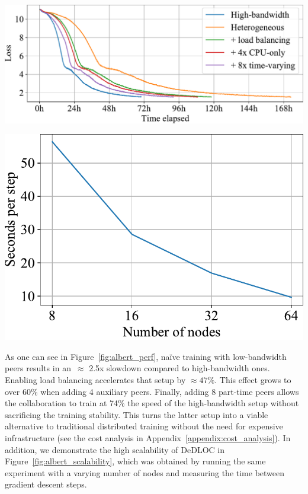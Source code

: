 \begin{minipage}[b][][b]{0.65\textwidth}
\centering
\includegraphics[width=\textwidth]{resources/convergence_albert.pdf}
\vspace{-14pt}
\label{fig:albert_perf}
\end{minipage}
\begin{minipage}[b][][b]{0.32\textwidth}
\centering
\includegraphics[width=\textwidth]{resources/albert_scalability.pdf}
\vspace{-14pt}
\label{fig:albert_scalability}
\end{minipage}

As one can see in Figure~\ref{fig:albert_perf}, naïve training with low-bandwidth peers results in an~$\approx$ 2.5x slowdown compared to high-bandwidth ones. Enabling load balancing accelerates that setup by $\approx47\%$. This effect grows to over 60\% when adding 4 auxiliary peers. Finally, adding 8 part-time peers allows the collaboration to train at 74\% the speed of the high-bandwidth setup without sacrificing the training stability. This turns the latter setup into a viable alternative to traditional distributed training without the need for expensive infrastructure (see the cost analysis in Appendix~\ref{appendix:cost_analysis}). In addition, we demonstrate the high scalability of DeDLOC in Figure~\ref{fig:albert_scalability}, which was obtained by running the same experiment with a varying number of nodes and measuring the time between gradient descent steps. 

